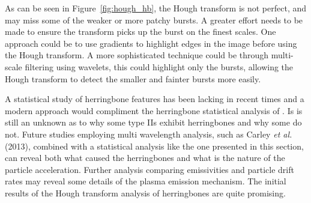 As can be seen in Figure~\ref{fig:hough_hb}, the Hough transform is not perfect, and may miss some of the weaker or more patchy bursts. A greater effort needs to be made to ensure the transform picks up the burst on the finest scales. One approach could be to use gradients to highlight edges in the image before using the Hough transform. A more sophisticated technique could be through multi-scale filtering using wavelets, this could highlight only the bursts, allowing the Hough transform to detect the smaller and fainter bursts more easily.

A statistical study of herringbone features has been lacking in recent times and a modern approach would compliment the herringbone statistical analysis of \citet{cairns1987, mann1995}. Is is still an unknown as to why some type IIs exhibit herringbones and why some do not. Future studies employing multi wavelength analysis, such as Carley {\it et al.}\,(2013), combined with a statistical analysis like the one presented in this section, can reveal both what caused the herringbones and what is the nature of the particle acceleration. Further analysis comparing emissivities and particle drift rates may reveal some details of the plasma emission mechanism. The initial results of the Hough transform analysis of herringbones are quite promising.



